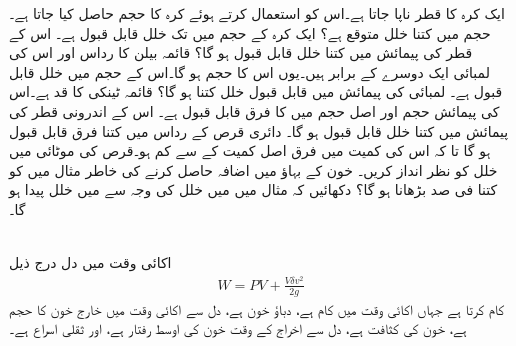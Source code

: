 ایک کرہ کا قطر  ناپا جاتا ہے۔اس کو استعمال کرتے ہوئے کرہ کا حجم حاصل کیا جاتا ہے۔ حجم میں کتنا خلل متوقع ہے؟
ایک کرہ کے حجم میں  تک خلل قابل قبول ہے۔ اس کے قطر کی پیمائش میں کتنا خلل قابل قبول ہو گا؟ 
 قائمہ بیلن کا رداس اور اس کی لمبائی ایک دوسرے کے برابر ہیں۔یوں اس کا حجم  ہو گا۔اس کے حجم میں  خلل قابل قبول ہے۔  لمبائی کی پیمائش میں قابل قبول خلل کتنا ہو گا؟
قائمہ ٹینکی کا قد  ہے۔اس کی پیمائش حجم اور اصل حجم میں  کا فرق قابل قبول ہے۔ اس کے اندرونی قطر کی پیمائش میں کتنا خلل قابل قبول ہو گا۔
 دائری قرص کے رداس میں کتنا فرق  قابل قبول ہو گا تا کہ اس کی کمیت میں فرق اصل کمیت کے  سے کم ہو۔قرص کی موٹائی میں خلل کو نظر انداز کریں۔ 
خون کے بہاؤ میں  اضافہ حاصل کرنے کی خاطر مثال  میں  کو کتنا فی صد بڑھانا ہو گا؟
دکھائیں کہ مثال  میں  میں  خلل کی وجہ سے  میں  خلل پیدا ہو گا۔

\\
اکائی وقت میں دل درج ذیل
\begin{align*}
W=PV+\frac{V\delta v^2}{2g}
\end{align*}
کام کرتا ہے جہاں  اکائی وقت میں کام ہے،  دباؤ خون ہے،  دل سے اکائی وقت میں خارج خون کا حجم ہے، خون کی کثافت ہے،  دل سے اخراج کے وقت خون کی اوسط رفتار ہے، اور  ثقلی اسراع ہے۔

